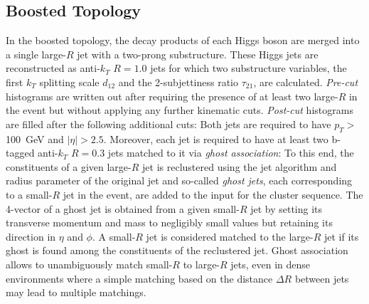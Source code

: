 \documentclass[12pt]{article}
\begin{document}
\subsection{Boosted Topology}\label{sec:Boosted_FR}

In the boosted topology, the decay products of each Higgs boson are merged into a single large-$R$ jet with a two-prong substructure. 
These Higgs jets are reconstructed as anti-$k_T$ $R=1.0$ jets for which two substructure variables, the first $k_T$ splitting scale $d_{12}$
and the 2-subjettiness ratio $\tau_{21}$, are calculated.
\textit{Pre-cut} histograms are written out after requiring the presence of at least two large-$R$ in the event but without applying any further
kinematic cuts. \textit{Post-cut} histograms are filled after the following additional cuts: 
Both jets are required to have $p_T >$100~GeV and $|\eta|>2.5$. Moreover, each jet is required to have at least two b-tagged anti-$k_T$ $R=0.3$ 
jets matched to it via \textit{ghost association}: 
To this end, the constituents of a given large-$R$ jet is reclustered using the jet algorithm 
and radius parameter of the original jet and so-called \textit{ghost jets}, each corresponding to a small-$R$ jet in the event, 
are added to the input for the cluster sequence. The 4-vector of a ghost jet is obtained from a given small-$R$ jet 
by setting its transverse momentum and mass to negligibly small values but retaining its direction in $\eta$ and $\phi$. A small-$R$ jet is 
considered matched to the large-$R$ jet if its ghost is found among the constituents of the reclustered jet. Ghost association allows to unambiguously
match small-$R$ to large-$R$ jets, even in dense environments where a simple matching based on the distance $\Delta R$ between jets 
may lead to multiple matchings.
\end{document}
